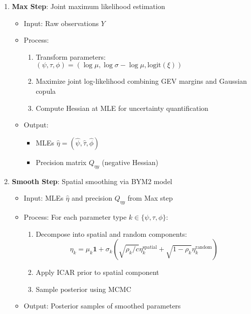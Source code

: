 \documentclass[
  letterpaper,
  DIV=11,
  numbers=noendperiod]{scrartcl}
\providecommand{\tightlist}{%
  \setlength{\itemsep}{0pt}\setlength{\parskip}{0pt}}\usepackage{longtable,booktabs,array}
\begin{document}
\begin{enumerate}
\def\labelenumi{\arabic{enumi}.}
\tightlist
\item
  \textbf{Max Step}: Joint maximum likelihood estimation

  \begin{itemize}
  \tightlist
  \item
    Input: Raw observations \(Y\)
  \item
    Process:

    \begin{enumerate}
    \def\labelenumii{\alph{enumii}.}
    \tightlist
    \item
      Transform parameters:
      \((\psi,\tau,\phi) = (\log\mu, \log\sigma-\log\mu, \text{logit}(\xi))\)
    \item
      Maximize joint log-likelihood combining GEV margins and Gaussian
      copula
    \item
      Compute Hessian at MLE for uncertainty quantification
    \end{enumerate}
  \item
    Output:

    \begin{itemize}
    \tightlist
    \item
      MLEs \(\hat{\eta} = (\hat{\psi}, \hat{\tau}, \hat{\phi})\)
    \item
      Precision matrix \(Q_{\eta y}\) (negative Hessian)
    \end{itemize}
  \end{itemize}
\item
  \textbf{Smooth Step}: Spatial smoothing via BYM2 model

  \begin{itemize}
  \tightlist
  \item
    Input: MLEs \(\hat{\eta}\) and precision \(Q_{\eta y}\) from Max
    step
  \item
    Process: For each parameter type \(k \in \{\psi, \tau, \phi\}\):

    \begin{enumerate}
    \def\labelenumii{\alph{enumii}.}
    \tightlist
    \item
      Decompose into spatial and random components:
      \[\eta_k = \mu_k\mathbf{1} + \sigma_k(\sqrt{\rho_k/c}\eta^{\mathrm{spatial}}_k + \sqrt{1-\rho_k}\eta^{\mathrm{random}}_k)\]
    \item
      Apply ICAR prior to spatial component
    \item
      Sample posterior using MCMC
    \end{enumerate}
  \item
    Output: Posterior samples of smoothed parameters
  \end{itemize}
\end{enumerate}
\end{document}
